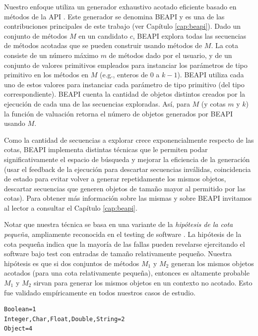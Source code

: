 Nuestro enfoque utiliza un generador exhaustivo acotado eficiente basado en métodos de la API \cite{Politano20}. Este generador se denomina BEAPI y es una de las contribuciones principales de este trabajo (ver Capítulo \ref{cap:beapi}).
Dado un conjunto de métodos $M$ en un candidato $c$, BEAPI explora todas las secuencias de métodos acotadas que se pueden construir usando métodos de $M$. La cota consiste de un número máximo $m$ de métodos dado por el usuario, y de un conjunto de valores primitivos empleados para instanciar los parámetros de tipo primitivo en los métodos en $M$ (e.g., enteros de \( 0 \) a \( k-1 \)). BEAPI utiliza cada uno de estos valores para instanciar cada parámetro de tipo primitivo (del tipo correspondiente). BEAPI cuenta la cantidad de objetos distintos creados por la ejecución de cada una de las secuencias exploradas. Así, para $M$ (y cotas $m$ y $k$) la función de valuación retorna el número de objetos generados por BEAPI usando $M$.

Como la cantidad de secuencias a explorar crece exponencialmente respecto de las cotas, BEAPI implementa distintas técnicas que le permiten podar significativamente el espacio de búsqueda y mejorar la eficiencia de la generación (usar el feedback de la ejecución para descartar secuencias inválidas, coincidencia de estado para evitar volver a generar repetidamente los mismos objetos, descartar secuencias que generen objetos de tamaño mayor al permitido por las cotas). Para obtener más información sobre las mismas y sobre BEAPI invitamos al lector a consultar el Capítulo \ref{cap:beapi}.

Notar que nuestra técnica se basa en una variante de la \emph{hipótesis de la cota pequeña}, ampliamente reconocida en el testing de software \cite{Andoni:2003,jackson2006, Abad13}. La hipótesis de la cota pequeña indica que la mayoría de las fallas pueden revelarse ejercitando el software bajo test con entradas de tamaño relativamente pequeño. Nuestra hipótesis es que si dos conjuntos de métodos $M_1$ y $M_2$ generan los mismos objetos acotados (para una cota relativamente pequeña), entonces es altamente probable $M_1$ y $M_2$ sirvan para generar los mismos objetos en un contexto no acotado. Esto fue validado empíricamente en todos nuestros casos de estudio.


\begin{lstlisting}[label=fig:rankParameters,caption=Ranking con los tipos de parametros, captionpos=b,frame=tb, float=t]
Boolean=1
Integer,Char,Float,Double,String=2
Object=4
\end{lstlisting}

